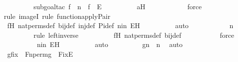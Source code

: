 \begin{isabellebody}
\ \ \ \ \ \ \ \ \isamarkupfalse%
{\isacharparenleft}{\kern0pt}subgoal{\isacharunderscore}{\kern0pt}tac\ {\isachardoublequoteopen}f\ {\isacharbackquote}{\kern0pt}\ n\ {\isasymin}\ f\ {\isacharbackquote}{\kern0pt}{\isacharbackquote}{\kern0pt}\ E{\isachardoublequoteclose}{\isacharparenright}{\kern0pt}\isanewline
\ \ \ \ \ \ \ \ \isamarkupfalse%
\ aH\ \isanewline
\ \ \ \ \ \ \ \ \ \isamarkupfalse%
\ force\ \isanewline
\ \ \ \ \ \ \ \ \isamarkupfalse%
{\isacharparenleft}{\kern0pt}rule\ imageI{\isacharcomma}{\kern0pt}\ rule\ function{\isacharunderscore}{\kern0pt}apply{\isacharunderscore}{\kern0pt}Pair{\isacharparenright}{\kern0pt}\isanewline
\ \ \ \ \ \ \ \ \isamarkupfalse%
\ fH\ nat{\isacharunderscore}{\kern0pt}perms{\isacharunderscore}{\kern0pt}def\ bij{\isacharunderscore}{\kern0pt}def\ inj{\isacharunderscore}{\kern0pt}def\ Pi{\isacharunderscore}{\kern0pt}def\ nin\ EH\isanewline
\ \ \ \ \ \ \ \ \isamarkupfalse%
\ auto\isanewline
\ \ \ \ \ \ \isamarkupfalse%
\ \isamarkupfalse%
\ {\isachardoublequoteopen}{\isachardot}{\kern0pt}{\isachardot}{\kern0pt}{\isachardot}{\kern0pt}\ {\isacharequal}{\kern0pt}\ n{\isachardoublequoteclose}\isanewline
\ \ \ \ \ \ \ \ \isamarkupfalse%
{\isacharparenleft}{\kern0pt}rule\ left{\isacharunderscore}{\kern0pt}inverse{\isacharparenright}{\kern0pt}\isanewline
\ \ \ \ \ \ \ \ \isamarkupfalse%
\ fH\ nat{\isacharunderscore}{\kern0pt}perms{\isacharunderscore}{\kern0pt}def\ bij{\isacharunderscore}{\kern0pt}def\isanewline
\ \ \ \ \ \ \ \ \ \isamarkupfalse%
\ force\isanewline
\ \ \ \ \ \ \ \ \isamarkupfalse%
\ nin\ EH\isanewline
\ \ \ \ \ \ \ \ \isamarkupfalse%
\ auto\isanewline
\ \ \ \ \ \ \isamarkupfalse%
\ \isamarkupfalse%
\ {\isachardoublequoteopen}g{\isacharbackquote}{\kern0pt}n\ {\isacharequal}{\kern0pt}\ n{\isachardoublequoteclose}\ \isamarkupfalse%
\ auto\isanewline
\ \ \ \ \isamarkupfalse%
\isanewline
\ \ \ \ \ \ \ \ \isanewline
\ \ \ \ \isamarkupfalse%
\ \isamarkupfalse%
\ gfix\ {\isacharcolon}{\kern0pt}\ {\isachardoublequoteopen}Fn{\isacharunderscore}{\kern0pt}perm{\isacharprime}{\kern0pt}{\isacharparenleft}{\kern0pt}g{\isacharparenright}{\kern0pt}\ {\isasymin}\ Fix{\isacharparenleft}{\kern0pt}E{\isacharparenright}{\kern0pt}{\isachardoublequoteclose}\ \isanewline
\ \ \ \ \ \ \isamarkupfalse%

\end{isabellebody}
